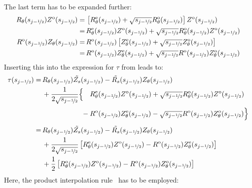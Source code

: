 The last term has to be expanded further:
\begin{align}
   R_\theta(s_{j-\nicefrac{1}{2}}) Z^\mathrm{o}(s_{j-\nicefrac{1}{2}})
  =&\, \left[ R_\theta^\mathrm{e}(s_{j-\nicefrac{1}{2}}) + \sqrt{s_{j-\nicefrac{1}{2}}} R_\theta^\mathrm{o}(s_{j-\nicefrac{1}{2}}) \right] Z^\mathrm{o}(s_{j-\nicefrac{1}{2}}) \nonumber \\
  =&\, R_\theta^\mathrm{e}(s_{j-\nicefrac{1}{2}}) Z^\mathrm{o}(s_{j-\nicefrac{1}{2}}) + \sqrt{s_{j-\nicefrac{1}{2}}} R_\theta^\mathrm{o}(s_{j-\nicefrac{1}{2}}) Z^\mathrm{o}(s_{j-\nicefrac{1}{2}}) \\
   R^\mathrm{o}(s_{j-\nicefrac{1}{2}}) Z_\theta(s_{j-\nicefrac{1}{2}})
  =&\, R^\mathrm{o}(s_{j-\nicefrac{1}{2}}) \left[ Z_\theta^\mathrm{e}(s_{j-\nicefrac{1}{2}}) + \sqrt{s_{j-\nicefrac{1}{2}}} Z_\theta^\mathrm{o}(s_{j-\nicefrac{1}{2}}) \right] \nonumber \\
  =&\, R^\mathrm{o}(s_{j-\nicefrac{1}{2}}) Z_\theta^\mathrm{e}(s_{j-\nicefrac{1}{2}}) + \sqrt{s_{j-\nicefrac{1}{2}}} R^\mathrm{o}(s_{j-\nicefrac{1}{2}}) Z_\theta^\mathrm{o}(s_{j-\nicefrac{1}{2}})
\end{align}
Inserting this into the expression for $\tau$ from  leads to:
\begin{align}
  \tau(s_{j-\half}) =&\,   R_\theta(s_{j-\half}) {\tilde{Z_s}}(s_{j-\half}) - {\tilde{R_s}}(s_{j-\half}) Z_\theta(s_{j-\half}) \nonumber \\
                    ~&\, + \frac{1}{2 \sqrt{s_{j-\half}}} \Bigl\{
                      \phantom{-}\,  R_\theta^\mathrm{e}(s_{j-\half}) Z^\mathrm{o}(s_{j-\half}) + \sqrt{s_{j-\half}} R_\theta^\mathrm{o}(s_{j-\half}) Z^\mathrm{o}(s_{j-\half}) \nonumber \\
                    ~&\, \phantom{+    \frac{1}{2 \sqrt{s_{j-\half}}} \Bigl\{}\,
                               - R^\mathrm{o}(s_{j-\half}) Z_\theta^\mathrm{e}(s_{j-\half}) - \sqrt{s_{j-\half}} R^\mathrm{o}(s_{j-\half}) Z_\theta^\mathrm{o}(s_{j-\half}) \Bigr\} \nonumber \\
                    =&\,   R_\theta(s_{j-\half}) {\tilde{Z_s}}(s_{j-\half}) - {\tilde{R_s}}(s_{j-\half}) Z_\theta(s_{j-\half}) \nonumber \\
                    ~&\, + \frac{1}{2 \sqrt{s_{j-\half}}} \left[ R_\theta^\mathrm{e}(s_{j-\half}) Z^\mathrm{o}(s_{j-\half}) - R^\mathrm{o}(s_{j-\half}) Z_\theta^\mathrm{e}(s_{j-\half}) \right] \nonumber \\
                    ~&\, + \frac{1}{2}                    \left[ R_\theta^\mathrm{o}(s_{j-\half}) Z^\mathrm{o}(s_{j-\half}) - R^\mathrm{o}(s_{j-\half}) Z_\theta^\mathrm{o}(s_{j-\half}) \right]
\end{align}
Here, the product interpolation rule~ has to be employed:
